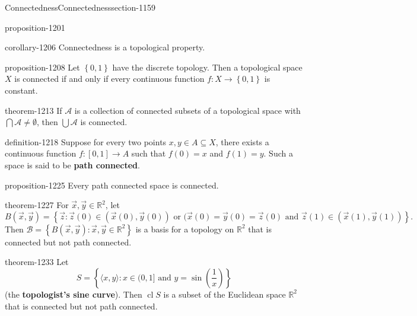 \documentclass[oneside,10pt,]{article}
\newcommand{\terminology}[1]{\textbf{#1}}
\newcommand{\tuple}[1]{\langle #1 \rangle}
\newcommand{\mb}{\mathbb}
\newcommand{\mc}{\mathcal}
\newcommand{\cl}{\operatorname{cl}}
\newcommand{\setBuilder}[2]{\left\{#1:#2\right\}}
\newcommand{\setList}[1]{\left\{#1\right\}}
\begin{document}
\begin{sectionptx}{Connectedness}{}{Connectedness}{}{}{section-1159}
\begin{proposition}{}{}{proposition-1201}
\end{proposition}
\begin{corollary}{}{}{corollary-1206}%
\hypertarget{p-1207}{}%
Connectedness is a topological property.%
\end{corollary}
\begin{proposition}{}{}{proposition-1208}%
\hypertarget{p-1209}{}%
Let \(\setList{0,1}\) have the discrete topology. Then a topological space \(X\) is connected if and only if every continuous function \(f:X\to\setList{0,1}\) is constant.%
\end{proposition}
\begin{theorem}{}{}{theorem-1213}%
\hypertarget{p-1214}{}%
If \(\mc A\) is a collection of connected subsets of a topological space with \(\bigcap\mc A\not=\emptyset\), then \(\bigcup\mc A\) is connected.%
\end{theorem}
\begin{definition}{}{definition-1218}%
\hypertarget{p-1219}{}%
Suppose for every two points \(x,y\in A\subseteq X\), there exists a continuous function \(f:[0,1]\to A\) such that \(f(0)=x\) and \(f(1)=y\). Such a space is said to be \terminology{path connected}.%
\end{definition}
\begin{proposition}{}{}{proposition-1225}%
\hypertarget{p-1226}{}%
Every path connected space is connected.%
\end{proposition}
\begin{theorem}{}{}{theorem-1227}%
\hypertarget{p-1228}{}%
For \(\vec x,\vec y\in\mb R^2\), let%
\begin{equation*}
B(\vec x,\vec y)=\setBuilder{\vec z}{\vec z(0)\in(\vec x(0),\vec y(0))
\text{ or } (\vec x(0)=\vec y(0)=\vec z(0) \text{ and }
\vec z(1)\in(\vec x(1),\vec y(1))}\text{.}
\end{equation*}
Then \(\mc B=\setBuilder{B(\vec x,\vec y)}{\vec x,\vec y\in\mb R^2}\) is a basis for a topology on \(\mb R^2\) that is connected but not path connected.%
\end{theorem}
\begin{theorem}{}{}{theorem-1233}%
\hypertarget{p-1234}{}%
Let%
\begin{equation*}
S=
\setBuilder{\tuple{x,y}}{x\in(0,1]\text{ and }
y=\sin\left(\frac{1}{x}\right)}
\end{equation*}
(the \terminology{topologist's sine curve}). Then \(\cl S\) is a subset of the Euclidean space \(\mb R^2\) that is connected but not path connected.%
\end{theorem}
\end{sectionptx}
\end{document}
